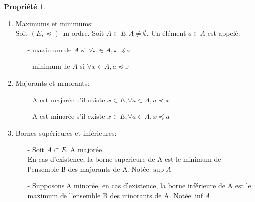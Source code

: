 \documentclass[fleqn]{article}
\theoremstyle{definition} \newtheorem*{defi}{D\'efinition}
\theoremstyle{definition} \newtheorem*{theo}{Th\'eor\`eme}
\theoremstyle{definition} \newtheorem*{coro}{Corollaire}
\theoremstyle{remark} \newtheorem*{rqs}{Remarques}
\theoremstyle{definition} \newtheorem*{prop}{Propri\'et\'e}
\begin{document}
\begin{prop} $ $
	\begin{enumerate}
		\item Maximums et minimums: \\
			Soit \((E, \preceq)\) un ordre. Soit \(A \subset E, A \neq \emptyset\). Un \'el\'ement \(a \in A\) est appel\'e:
			\begin{itemize}
				\item [-] maximum de \(A\) si \(\forall x \in A, x \preceq a\)
				\item [-] minimum de \(A\) si \(\forall x \in A, a \preceq x\)
			\end{itemize}
		\item Majorants et minorants:
			\begin{itemize}
				\item [-] A est major\'ee s'il existe \(x \in E, \forall a \in A, a \preceq x\)
				\item [-] A est minor\'ee s'il existe \(x \in E, \forall a \in A, x \preceq a\)
			\end{itemize}
		\item Bornes sup\'erieures et inf\'erieures:
			\begin{itemize}
				\item [-] Soit \(A \subset E\), A major\'ee. \\
					En cas d'existence, la borne sup\'erieure de A est le minimum de l'ensemble B des majorants de A. Not\'ee $\sup A$
				\item [-] Supposons A minor\'ee, en cas d'existence, la borne inf\'erieure de A est le maximum de l'ensemble B des minorants de A.
					Not\'ee $\inf A$ \\
			\end{itemize}
	\end{enumerate}
\end{prop}
\end{document}
